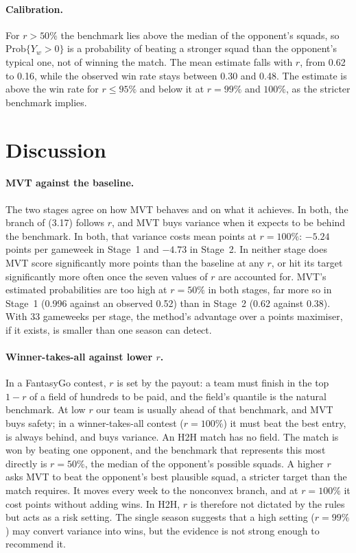 \paragraph{Calibration.} For $r>50\%$ the benchmark lies above the median of the opponent's
squads, so $\mathrm{Prob}\{Y_w>0\}$ is a probability of beating a stronger squad than the
opponent's typical one, not of winning the match. The mean estimate falls with $r$, from 0.62
to 0.16, while the observed win rate stays between 0.30 and 0.48. The estimate is above the win
rate for $r\le 95\%$ and below it at $r=99\%$ and $100\%$, as the stricter benchmark implies.

\section{Discussion}
\label{sec:discussion}

\paragraph{MVT against the baseline.} The two stages agree on how MVT behaves and on what it
achieves. In both, the branch of (3.17) follows $r$, and MVT buys variance when it expects to be
behind the benchmark. In both, that variance costs mean points at $r=100\%$: $-5.24$ points per
gameweek in Stage~1 and $-4.73$ in Stage~2. In neither stage does MVT score significantly more
points than the baseline at any $r$, or hit its target significantly more often once the
seven values of $r$ are accounted for. MVT's estimated probabilities are too high at $r=50\%$ in
both stages, far more so in Stage~1 (0.996 against an observed 0.52) than in Stage~2 (0.62
against 0.38). With 33 gameweeks per stage, the method's advantage over a points maximiser, if
it exists, is smaller than one season can detect.

\paragraph{Winner-takes-all against lower $r$.} In a FantasyGo contest, $r$ is set by the
payout: a team must finish in the top $1-r$ of a field of hundreds to be paid, and the field's
quantile is the natural benchmark. At low $r$ our team is usually ahead of that benchmark, and
MVT buys safety; in a winner-takes-all contest ($r=100\%$) it must beat the best entry, is
always behind, and buys variance. An H2H match has no field. The match is won by beating one
opponent, and the benchmark that represents this most directly is $r=50\%$, the median of the
opponent's possible squads. A higher $r$ asks MVT to beat the opponent's best plausible squad,
a stricter target than the match requires. It moves every week to the nonconvex branch, and at
$r=100\%$ it cost points without adding wins. In H2H, $r$ is therefore not dictated by the
rules but acts as a risk setting. The single season suggests that a high setting ($r=99\%$) may
convert variance into wins, but the evidence is not strong enough to recommend it.

